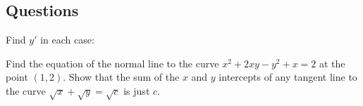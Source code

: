 \subsection*{Questions}
\begin{questions}
  \question Find $ y' $ in each case:
  \question Find the equation of the normal line to the curve $ x^2 + 2xy - y^2 + x = 2 $ at the point $ (1, 2) $.
  \question Show that the sum of the $ x $ and $ y $ intercepts of any tangent line to the curve $ \sqrt{x} + \sqrt{y} = \sqrt{c} $
            is just $ c $.
\end{questions}


